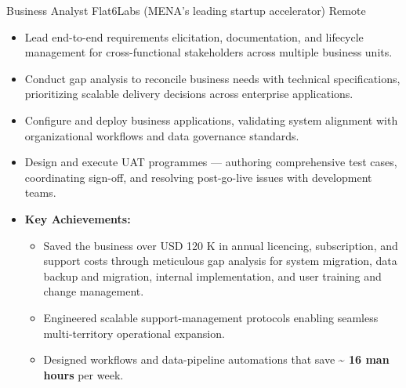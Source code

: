 \documentclass[11pt,a4paper,sans]{moderncv}
\begin{document}
%
  {Business Analyst}%
  {Flat6Labs \textnormal{\small(MENA's leading startup accelerator)}}%
  {Remote}{}%
  {%
  \begin{itemize}
    \item Lead end-to-end requirements elicitation, documentation, and lifecycle management for
          cross-functional stakeholders across multiple business units.
    \item Conduct gap analysis to reconcile business needs with technical specifications,
          prioritizing scalable delivery decisions across enterprise applications.
    \item Configure and deploy business applications, validating system alignment with
          organizational workflows and data governance standards.
    \item Design and execute UAT programmes — authoring comprehensive test cases, coordinating
          sign-off, and resolving post-go-live issues with development teams.
    \item[\textbf{$\star$}] \textbf{Key Achievements:}
      \begin{itemize}
        \item Saved the business over USD 120 K in annual licencing, subscription, and support
	      costs through meticulous gap analysis for system migration, data backup and
	      migration, internal implementation, and user training and change management.
        \item Engineered scalable support-management protocols enabling seamless multi-territory
              operational expansion.
        \item Designed workflows and data-pipeline automations that save \textbf{\textasciitilde{}
		16 man hours} per week.
      \end{itemize}
  \end{itemize}%
  }
\end{document}
